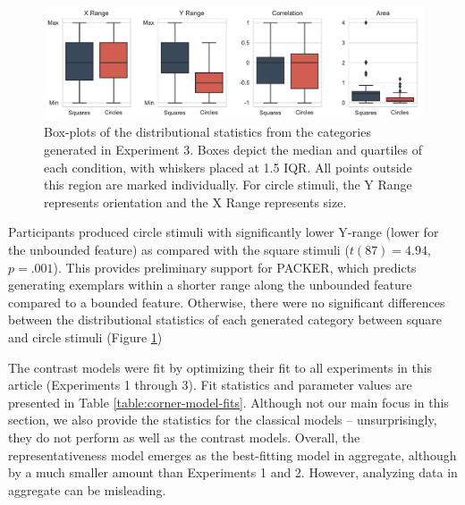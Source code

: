 \documentclass[12pt]{article}
\begin{document}
\begin{flushleft}
\begin{figure}
    \begin{center}
      \includegraphics[width=\textwidth]{figs/e3-statsboxes.pdf}
    \caption{Box-plots of the distributional statistics from the categories
generated in Experiment 3. Boxes depict the median and quartiles of each
condition, with whiskers placed at 1.5 IQR. All points outside this region are
marked individually. For circle stimuli, the Y Range represents orientation and
the X Range represents size.}
    \label{fig:e3-statsboxes}
    \end{center}
\end{figure}

Participants produced circle stimuli with significantly lower Y-range (lower for the unbounded feature) as compared with the square stimuli ($t(87) = 4.94$, $p = .001$).  This
provides preliminary support for PACKER, which predicts generating exemplars
within a shorter range along the unbounded feature compared to a bounded
feature. Otherwise, there were no significant differences between the distributional statistics of each
generated category between square and circle stimuli (Figure
\ref{fig:e3-statsboxes})

The contrast models were fit by optimizing their fit to all experiments in this
article (Experiments 1 through 3). Fit statistics and parameter values are
presented in Table \ref{table:corner-model-fits}. Although not our main focus in
this section, we also provide the statistics for the classical models --
unsurprisingly, they do not perform as well as the contrast models. Overall,
the representativeness model emerges as the best-fitting model in aggregate, although by a much smaller amount than Experiments 1 and 2. However, analyzing data in aggregate can be misleading.



\end{flushleft}
\end{document}
